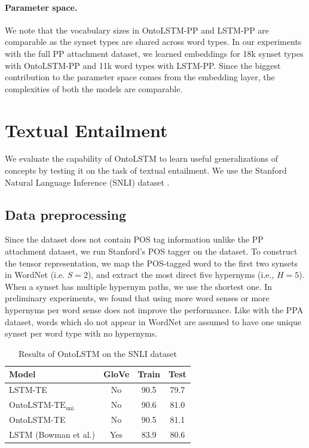\paragraph{Parameter space.} We note that the vocabulary sizes in OntoLSTM-PP and LSTM-PP are comparable as the synset types are shared across word types. 
In our experiments with the full PP attachment dataset, we learned embeddings for 18k synset types with OntoLSTM-PP and 11k word types with LSTM-PP. Since the biggest contribution to the parameter space comes from the embedding layer,
the complexities of both the models are comparable.

\section{Textual Entailment}
\label{sec:ontolstm_snli}
We evaluate the capability of OntoLSTM to learn useful generalizations of concepts by testing it on
the task of textual entailment. We use the Stanford Natural Language Inference (SNLI) dataset \cite{bowman:15}.

\subsection{Data preprocessing} Since the dataset does not contain POS tag information unlike the PP attachment dataset,
we run Stanford's POS tagger \citep{toutanova:03} on the dataset.
To construct the tensor representation, we map the POS-tagged word to the first 
two synsets in WordNet (i.e. $S=2$), and extract the most direct five hypernyms 
(i.e., $H=5$). When a synset has multiple hypernym paths, we use the shortest 
one. In preliminary experiments, we found that using more word senses or more 
hypernyms per word sense does not improve the performance.
Like with the PPA dataset, words which do not appear in WordNet are assumed to
have one unique synset per word type with no hypernyms.

\begin{table}
    \centering
    \begin{tabular}{|l|c|c|c|}
    \hline
    \textbf{Model} & \textbf{GloVe} & \textbf{Train} & \textbf{Test}\\
    \hline
    LSTM-TE                        & No & 90.5 & 79.7 \\
    $\text{OntoLSTM-TE}_\text{uni}$  & No & 90.6 & 81.0 \\
    OntoLSTM-TE  & No & 90.5 & 81.1 \\ \hline
    LSTM (Bowman et al.) & Yes & 83.9 & 80.6 \\
    \hline
    \end{tabular}
    \caption{Results of OntoLSTM on the SNLI dataset}
    \label{tab:ontolstm_snli_results}
\end{table}

